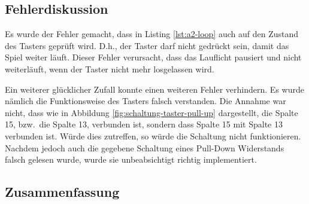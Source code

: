 \subsection{Fehlerdiskussion}
\label{sec:a2-fehlerdiskussion}

Es wurde der Fehler gemacht, dass in Listing \ref{lst:a2-loop} auch auf den Zustand des Tasters geprüft wird.
D.h., der Taster darf nicht gedrückt sein, damit das Spiel weiter läuft.
Dieser Fehler verursacht, dass das Lauflicht pausiert und nicht weiterläuft, wenn der Taster nicht mehr losgelassen wird.

Ein weiterer glücklicher Zufall konnte einen weiteren Fehler verhindern.
Es wurde nämlich die Funktionsweise des Tasters falsch verstanden.
Die Annahme war nicht, dass wie in Abbildung \ref{fig:schaltung-taster-pull-up} dargestellt, die Spalte 15, bzw.\ die Spalte 13,  verbunden ist, sondern dass Spalte 15 mit Spalte 13 verbunden ist.
Würde dies zutreffen, so würde die Schaltung nicht funktionieren.
Nachdem jedoch auch die gegebene Schaltung eines Pull-Down Widerstands falsch gelesen wurde, wurde sie unbeabsichtigt richtig implementiert.

\subsection{Zusammenfassung}
\label{sec:a2-zusammenfassung}
